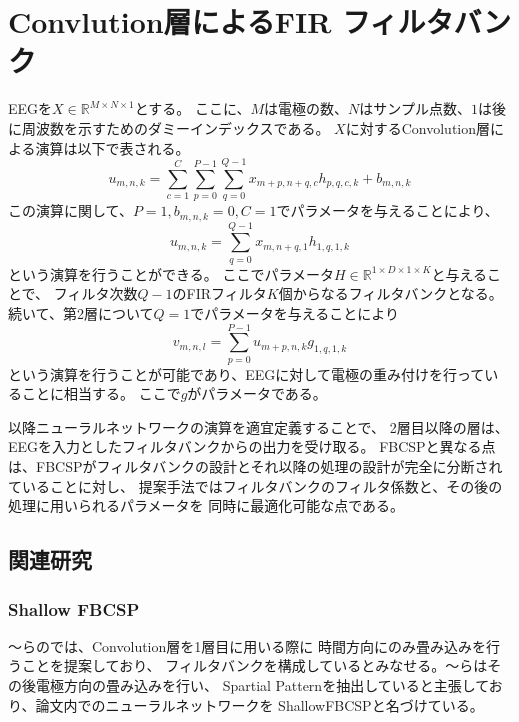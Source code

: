 \section{\rm Convlution層によるFIR フィルタバンク}
EEGを\(X\in \mathbb R^{M\times N\times 1}\)とする。
ここに、\(M\)は電極の数、\(N\)はサンプル点数、\(1\)は後に周波数を示すためのダミーインデックスである。
\(X\)に対するConvolution層による演算は以下で表される。
\begin{equation}
    u_{m,n,k} = \sum_{c=1}^C\sum_{p=0}^{P-1}\sum_{q=0}^{Q-1} x_{m+p,n+q,c} h_{p,q,c,k} + b_{m,n,k}
\end{equation} 
この演算に関して、\(P=1,b_{m,n,k}=0,C=1\)でパラメータを与えることにより、
\begin{equation}
    u_{m,n,k} = \sum_{q=0}^{Q-1} x_{m,n+q,1} h_{1,q,1,k}
    \label{eq:pseudoFIR}
\end{equation} 
という演算を行うことができる。
ここでパラメータ\(H\in \mathbb R^{1\times D\times 1\times K}\)と与えることで、
フィルタ次数\(Q-1\)のFIRフィルタ\(K\)個からなるフィルタバンクとなる。
続いて、第2層について\(Q=1\)でパラメータを与えることにより
\begin{equation}
    v_{m,n,l} = \sum_{p=0}^{P-1} u_{m+p,n,k} g_{1,q,1,k}
    \label{eq:pseudoFIR}
\end{equation} 
という演算を行うことが可能であり、EEGに対して電極の重み付けを行っていることに相当する。
ここで\(g\)がパラメータである。

以降ニューラルネットワークの演算を適宜定義することで、
2層目以降の層は、EEGを入力としたフィルタバンクからの出力を受け取る。
FBCSPと異なる点は、FBCSPがフィルタバンクの設計とそれ以降の処理の設計が完全に分断されていることに対し、
提案手法ではフィルタバンクのフィルタ係数と、その後の処理に用いられるパラメータを
同時に最適化可能な点である。

\subsection{\mc 関連研究}
\subsubsection{\rm Shallow FBCSP}
〜らの\cite{ShallowFBCSP}では、Convolution層を1層目に用いる際に
時間方向にのみ畳み込みを行うことを提案しており、
フィルタバンクを構成しているとみなせる。〜らはその後電極方向の畳み込みを行い、
Spartial Patternを抽出していると主張しており、論文内でのニューラルネットワークを
ShallowFBCSPと名づけている。

